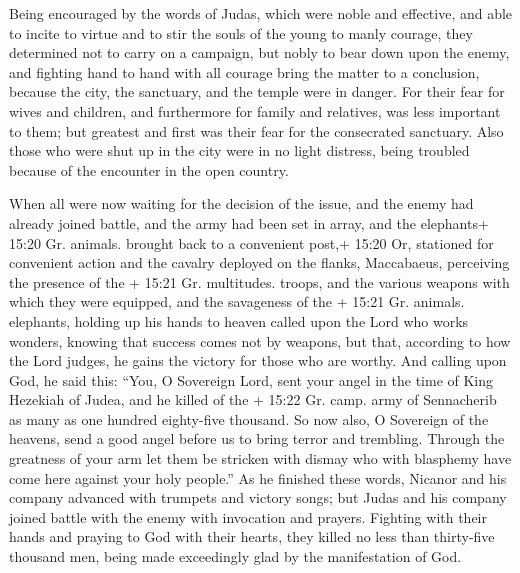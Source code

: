  Being encouraged by the words of Judas, which were noble
and effective, and able to incite to virtue and to stir the souls of the
young to manly courage, they determined not to carry on a campaign, but
nobly to bear down upon the enemy, and fighting hand to hand with all
courage bring the matter to a conclusion, because the city, the
sanctuary, and the temple were in danger.  For their fear
for wives and children, and furthermore for family and relatives, was
less important to them; but greatest and first was their fear for the
consecrated sanctuary.  Also those who were shut up in the
city were in no light distress, being troubled because of the encounter
in the open country.

 When all were now waiting for the decision of the issue,
and the enemy had already joined battle, and the army had been set in
array, and the elephants+ 15:20 Gr. animals. brought back to a
convenient post,+ 15:20 Or, stationed for convenient action and the
cavalry deployed on the flanks,  Maccabaeus, perceiving the
presence of the + 15:21 Gr. multitudes. troops, and the various weapons
with which they were equipped, and the savageness of the + 15:21 Gr.
animals. elephants, holding up his hands to heaven called upon the Lord
who works wonders, knowing that success comes not by weapons, but that,
according to how the Lord judges, he gains the victory for those who are
worthy.  And calling upon God, he said this: ``You, O
Sovereign Lord, sent your angel in the time of King Hezekiah of Judea,
and he killed of the + 15:22 Gr. camp. army of Sennacherib as many as
one hundred eighty-five thousand.  So now also, O Sovereign
of the heavens, send a good angel before us to bring terror and
trembling.  Through the greatness of your arm let them be
stricken with dismay who with blasphemy have come here against your holy
people.'' As he finished these words,  Nicanor and his
company advanced with trumpets and victory songs;  but
Judas and his company joined battle with the enemy with invocation and
prayers.  Fighting with their hands and praying to God with
their hearts, they killed no less than thirty-five thousand men, being
made exceedingly glad by the manifestation of God.

